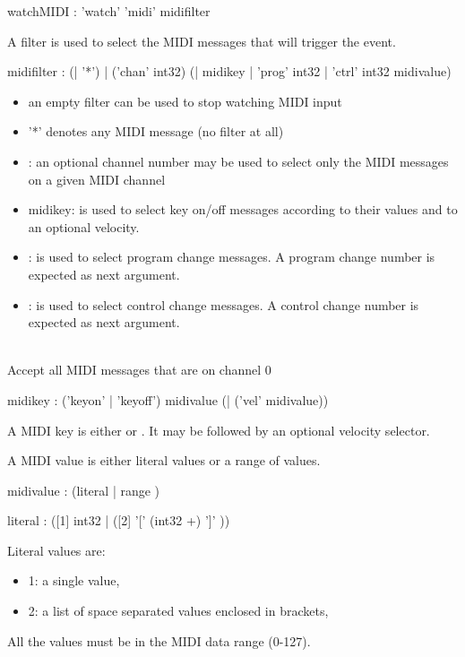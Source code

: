 \documentclass[a4paper,twoside]{article}
\begin{document}
\begin{rail}
watchMIDI : 'watch' 'midi' midifilter
\end{rail}
A filter is used to select the MIDI messages that will trigger the event.

\begin{rail}
midifilter : (| '*')
			 | ('chan' int32) 
			 (| midikey | 'prog' int32 | 'ctrl' int32 midivalue)
\end{rail}

\begin{itemize}
\item an empty filter can be used to stop watching MIDI input
\item '*' denotes any MIDI message (no filter at all)
\item {}: an optional channel number may be used to select only the MIDI messages on a given MIDI channel
\item midikey: is used to select key on/off messages according to their values and to an optional velocity.
\item {}: is used to select program change messages. A program change number is expected as next argument.
\item {}: is used to select control change messages. A control change number is expected as next argument.
\end{itemize}

\example\\
Accept all MIDI messages that are on channel 0

\begin{rail}
midikey : 
			 ('keyon' | 'keyoff') midivalue (| ('vel' midivalue))
\end{rail}

A MIDI key is either  or . It may be followed by an optional velocity selector.

A MIDI value is either literal values or a range of values.

\begin{rail}
midivalue : 
			(literal | range )
\end{rail}

\begin{rail}
literal : ([1] int32 | ([2] '[' (int32 +) ']' ))
\end{rail}

Literal values are:
\begin{itemize}
\item 1: a single value,
\item 2: a list of space separated values enclosed in brackets,
\end{itemize}
All the values must be in the MIDI data range (0-127).
\end{document}
